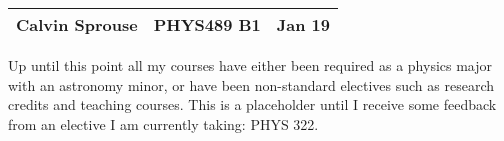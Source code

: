 \documentclass[a4paper, 12pt]{config/homework}
\begin{document}
\noindent
\begin{tabularx}{\textwidth}{>{\centering\arraybackslash}X>{\centering\arraybackslash}X>{\centering\arraybackslash}X}
Calvin Sprouse & PHYS489 B1 & 2024 Jan 19\\
\midrule
\end{tabularx}

Up until this point all my courses have either been required as a physics major with an astronomy minor, or have been non-standard electives such as research credits and teaching courses. This is a placeholder until I receive some feedback from an elective I am currently taking: PHYS 322.
\end{document}
